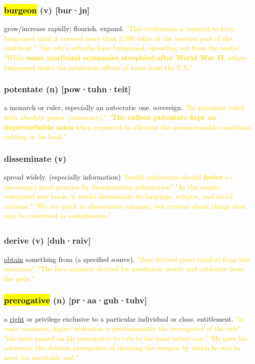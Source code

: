 \documentclass{proc}
\begin{document}
	\subsubsection{\textcolor{brickred}{\hl{burgeon}} (v) [bur·jn]}
	grow/increase rapidly; flourish. expand.
	\textcolor{gold}{"This civilization is reputed to have burgeoned until it covered more than 2,500 miles of the western part of the continent." "the city's suburbs have burgeoned, sprawling out from the centre" "While \textbf{some moribund economies atrophied after World War II}, others burgeoned under the salubrious effects of loans from the U.S."}
	
	\subsubsection{\textcolor{brickred}{potentate} (n) [pow·tuhn·teit]}
	a monarch or ruler, especially an autocratic one. sovereign.
	\textcolor{gold}{"Its potentate ruled with absolute power (autocracy)." "\textbf{The callous potentate kept an imperturbable mien} when requested to alleviate the unconscionable conditions existing in his land."}
	
	\subsubsection{\textcolor{brickred}{disseminate} (v)}
	spread widely. (especially information)
	\textcolor{gold}{"health authorities should \textbf{foster} (= encourage) good practice by disseminating information" "As the empire conquered new lands, it would disseminate its language, religion, and social customs." "We are quick to disseminate calumny, but reticent about things that may be construed as compliments."}
	
	\newpage
	\subsection{}
	\subsubsection{\textcolor{brickred}{derive} (v) [duh·raiv]}
	\underline{obtain} something from (a specified source).
	\textcolor{gold}{"they derived great comfort from this assurance" "The Inca emperor derived his prodigious power and authority from the gods."}
	
	\subsubsection{\textcolor{brickred}{\hl{prerogative}} (n) [pr·aa·guh·tuhv]}
	a \underline{right} or privilege exclusive to a particular individual or class. entitlement.
	\textcolor{gold}{"in some countries, higher education is predominantly the prerogative of the rich" "the ruler passed on his prerogative to rule to his most astute son." "He gave his adversary the dubious prerogative of choosing the weapon by which he was to meet his inevitable end."}
	
\end{document}
